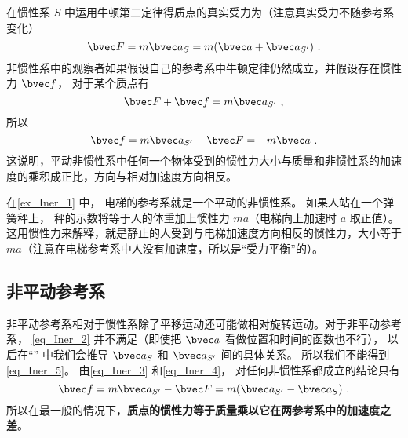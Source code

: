 在惯性系 $S$ 中运用牛顿第二定律得质点的真实受力为（注意真实受力不随参考系变化）
\begin{equation}\label{eq_Iner_3}
\bvec F = m \bvec a_{S} = m(\bvec a + \bvec a_{S'} )~.
\end{equation}
非惯性系中的观察者如果假设自己的参考系中牛顿定律仍然成立，并假设存在惯性力 $\bvec f$， 对于某个质点有
\begin{equation}\label{eq_Iner_4}
\bvec F + \bvec f = m \bvec a_{S'}~,
\end{equation}
所以
\begin{equation}\label{eq_Iner_5}
\bvec f = m \bvec a_{S'} - \bvec F =  - m\bvec a~.
\end{equation}
这说明，平动非惯性系中任何一个物体受到的惯性力大小与质量和非惯性系的加速度的乘积成正比，方向与相对加速度方向相反。

在\autoref{ex_Iner_1} 中， 电梯的参考系就是一个平动的非惯性系。 如果人站在一个弹簧秤上， 秤的示数将等于人的体重加上惯性力 $ma$（电梯向上加速时 $a$ 取正值）。 这用惯性力来解释，就是静止的人受到与电梯加速度方向相反的惯性力，大小等于 $ma$（注意在电梯参考系中人没有加速度，所以是“受力平衡”的）。

\subsection{非平动参考系}
非平动参考系相对于惯性系除了平移运动还可能做相对旋转运动。对于非平动参考系， \autoref{eq_Iner_2} 并不满足（即使把 $\bvec a$ 看做位置和时间的函数也不行）， 以后在“” 中我们会推导 $\bvec a_{S}$ 和 $\bvec a_{S'}$ 间的具体关系。 所以我们不能得到\autoref{eq_Iner_5}。 由\autoref{eq_Iner_3} 和\autoref{eq_Iner_4}， 对任何非惯性系都成立的结论只有
\begin{equation}
\bvec f = m \bvec a_{S'} - \bvec F =  m( \bvec a_{S'} - \bvec a_{S})~.
\end{equation}
所以在最一般的情况下，\textbf{质点的惯性力等于质量乘以它在两参考系中的加速度之差}。


